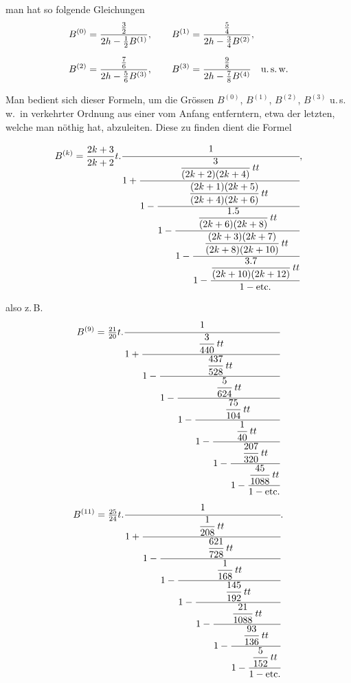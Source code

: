 %
\noindent man hat so folgende Gleichungen
\[
\begin{aligned}
B^{(0)}&=\frac{\frac{3}{2}}{2h-\frac{1}{2}B^{(1)}},\qquad
B^{(1)}=\frac{\frac{5}{4}}{2h-\frac{3}{4}B^{(2)}},\\[6pt]
B^{(2)}&=\frac{\frac{7}{6}}{2h-\frac{5}{6}B^{(3)}},\qquad
B^{(3)}=\frac{\frac{9}{8}}{2h-\frac{7}{8}B^{(4)}}\quad\text{u.\,s.\,w.}
\end{aligned}
\]

Man bedient sich dieser Formeln, um die Grössen $B^{(0)}$, $B^{(1)}$,
$B^{(2)}$, $B^{(3)}$ u.\,s.\,w.\ in verkehrter Ordnung aus einer vom
Anfang entferntern, etwa der letzten, welche man nöthig hat, abzuleiten. Diese zu finden
dient die Formel

\[
B^{(k)}=\frac{2k+3}{2k+2}t\mathord{.}\cfrac{1}{1+\cfrac{\dfrac{3}{(2k+2)(2k+4)}\,tt}{1-\cfrac{\dfrac{(2k+1)(2k+5)}{(2k+4)(2k+6)}\,tt}{1-\cfrac{\dfrac{1.5}{(2k+6)(2k+8)}\,tt}{1-\cfrac{\dfrac{(2k+3)(2k+7)}{(2k+8)(2k+10)}\,tt}{1-\cfrac{\dfrac{3.7}{(2k+10)(2k+12)}\,tt}{1-\text{etc.}}}}}}},
\]

\noindent also z.\,B.
\[
B^{(9)}=\tfrac{21}{20}t\mathord{.}\cfrac{1}{1+\cfrac{\dfrac{3}{440}\,tt}{1-\cfrac{\dfrac{437}{528}\,tt}{1-\cfrac{\dfrac{5}{624}\,tt}{1-\cfrac{\dfrac{75}{104}\,tt}{1-\cfrac{\dfrac{1}{40}\,tt}{1-\cfrac{\dfrac{207}{320}\,tt}{1-\cfrac{\dfrac{45}{1088}\,tt}{1-\text{etc.}}}}}}}}}
\]
\[
B^{(11)}=\tfrac{25}{24}t\mathord{.}\cfrac{1}{1+\cfrac{\dfrac{1}{208}\,tt}{1-\cfrac{\dfrac{621}{728}\,tt}{1-\cfrac{\dfrac{1}{168}\,tt}{1-\cfrac{\dfrac{145}{192}\,tt}{1-\cfrac{\dfrac{21}{1088}\,tt}{1-\cfrac{\dfrac{93}{136}\,tt}{1-\cfrac{\dfrac{5}{152}\,tt}{1-\text{etc.}}}}}}}}}.
\]
